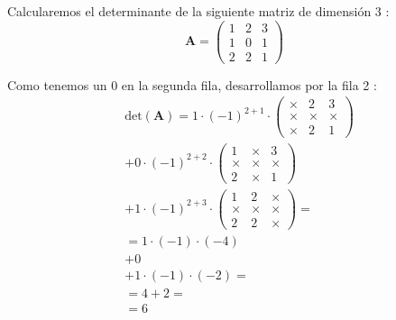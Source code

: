 \begin{example}
Calcularemos el determinante de la siguiente matriz de dimensión 3 :
$$
\boldsymbol{A}=\left(\begin{array}{lll}
1 & 2 & 3 \\
1 & 0 & 1 \\
2 & 2 & 1
\end{array}\right)
$$

Como tenemos un 0 en la segunda fila, desarrollamos por la fila 2 :
$$
\begin{aligned}
&\text{det}(\boldsymbol{A}) =1 \cdot(-1)^{2+1} \cdot\left(\begin{array}{ccc}
\times & 2 & 3 \\
\times & \times & \times \\
\times & 2 & 1
\end{array}\right) \\
& +0 \cdot(-1)^{2+2} \cdot\left(\begin{array}{ccc}
1 & \times & 3 \\
\times & \times & \times \\
2 & \times & 1
\end{array}\right) \\
& +1 \cdot(-1)^{2+3} \cdot\left(\begin{array}{lll}
1 & 2 & \times \\
\times & \times & \times \\
2 & 2 & \times
\end{array}\right)= \\
& =1 \cdot(-1) \cdot(-4) \\
& +0 \\
& +1 \cdot(-1) \cdot(-2)= \\
& =4+2= \\
& =6
\end{aligned}
$$  
\end{example}
